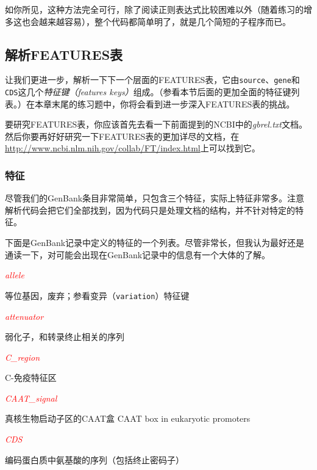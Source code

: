 如你所见，这种方法完全可行，除了阅读正则表达式比较困难以外（随着练习的增多这也会越来越容易），整个代码都简单明了，就是几个简短的子程序而已。

\subsection{解析FEATURES表}
让我们更进一步，解析一下下一个层面的FEATURES表，它由\verb|source|、\verb|gene|和\verb|CDS|这几个\textit{特征键（features
keys）}组成。（参看本节后面的更加全面的特征键列表。）在本章末尾的练习题中，你将会看到进一步深入FEATURES表的挑战。

要研究FEATURES表，你应该首先去看一下前面提到的NCBI中的\textit{gbrel.txt}文档。然后你要再好好研究一下FEATURES表的更加详尽的文档，在\href{http://www.ncbi.nlm.nih.gov/collab/FT/index.html}{http://www.ncbi.nlm.nih.gov/collab/FT/index.html}上可以找到它。

\subsubsection{特征}
尽管我们的GenBank条目非常简单，只包含三个特征，实际上特征非常多。注意解析代码会把它们全部找到，因为代码只是处理文档的结构，并不针对特定的特征。

下面是GenBank记录中定义的特征的一个列表。尽管非常长，但我认为最好还是通读一下，对可能会出现在GenBank记录中的信息有一个大体的了解。

\textcolor{red}{\textit{allele}}
\begin{adjustwidth}{1cm}{}
等位基因，废弃；参看变异（\verb|variation|）特征键
\end{adjustwidth}

\textcolor{red}{\textit{attenuator}}
\begin{adjustwidth}{1cm}{}
弱化子，和转录终止相关的序列
\end{adjustwidth}

\textcolor{red}{\textit{C\_region}}
\begin{adjustwidth}{1cm}{}
C-免疫特征区
\end{adjustwidth}

\textcolor{red}{\textit{CAAT\_signal}}
\begin{adjustwidth}{1cm}{}
真核生物启动子区的CAAT盒
CAAT box in eukaryotic promoters
\end{adjustwidth}

\textcolor{red}{\textit{CDS}}
\begin{adjustwidth}{1cm}{}
编码蛋白质中氨基酸的序列（包括终止密码子）
\end{adjustwidth}

